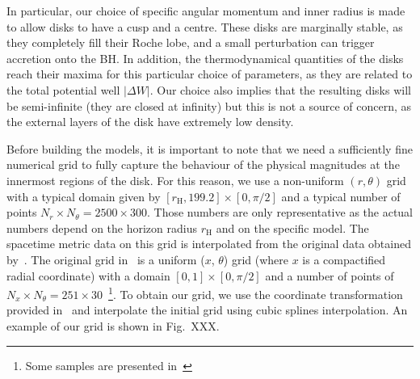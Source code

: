 \documentclass[twocolumn,aps,showpacs,showkeys,prd,superscriptaddress,byrevtex, amsmath]{revtex4-1}
\begin{document}
In particular, our choice of specific angular momentum and inner radius is made to allow disks to have a cusp and a centre. These disks are marginally stable, as they completely fill their Roche lobe, and a small perturbation can trigger accretion onto the BH. In addition, the thermodynamical quantities of the disks reach their maxima for this particular choice of parameters, as they are related to the total potential well $|\Delta W|$. Our choice also implies that the resulting disks will be semi-infinite (they are closed at infinity) but this is not a source of concern, as the external layers of the disk have extremely low density.

Before building the models, it is important to note that we need a sufficiently fine numerical grid to fully capture the behaviour of the physical magnitudes at the innermost regions of the disk. For this reason, we use a non-uniform $(r, \theta)$ grid with a typical domain given by $[r_{\mathrm{H}}, 199.2] \times [0, \pi/2]$ and a typical number of points $N_r \times N_{\theta} = 2500 \times 300$. Those numbers are only representative as the actual numbers depend on the horizon radius $r_{\mathrm{H}}$ and on the specific model. The spacetime metric data on this grid is interpolated from the original data obtained by~\cite{Herdeiro:2015b}. The original grid in~\cite{Herdeiro:2015b} is a uniform ($x$, $\theta$) grid (where $x$ is a compactified radial coordinate) with a domain $[0, 1] \times [0, \pi/2]$ and a number of points of $N_x \times N_{\theta} = 251 \times 30$~\footnote{Some samples are presented in~\cite{grav_web}}. To obtain our grid, we use the coordinate transformation provided in~\cite{grav_web} and interpolate the initial grid using cubic splines interpolation. An example of our grid is shown in Fig.~XXX.  

 
\end{document}
